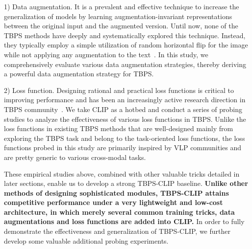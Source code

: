 \documentclass[letterpaper]{article} %
\begin{document}
1) Data augmentation.
It is a prevalent and effective technique to increase the generalization of models by learning augmentation-invariant representations between the original input and the augmented version. 
Until now, none of the TBPS methods have deeply and systematically explored this technique. Instead, they typically employ a simple utilization of random horizontal flip for the image while not applying any augmentation to the text~\cite{wang2020vitaa, chen2022tipcb, ding2021semantically}.
In this study, we comprehensively evaluate various data augmentation strategies, thereby deriving a powerful data augmentation strategy for TBPS.

2) Loss function.
Designing rational and practical loss functions is critical to improving performance and has been an increasingly active research direction in TBPS community~\cite{zhang2018deep, bai2023rasa}.
We take CLIP as a hotbed and conduct a series of probing studies to analyze the effectiveness of various loss functions in TBPS.
Unlike the loss functions in existing TBPS methods that are well-designed mainly from exploring the TBPS task and belong to the task-oriented loss functions, the loss functions probed in this study are primarily inspired by VLP communities and are pretty generic to various cross-modal tasks.

These empirical studies above, combined with other valuable tricks detailed in later sections, enable us to develop a strong TBPS-CLIP baseline.
\textbf{Unlike other methods of designing sophisticated modules, TBPS-CLIP attains competitive performance under a very lightweight and low-cost architecture, in which merely several common training tricks, data augmentations and loss functions are added into CLIP.}
In order to fully demonstrate the effectiveness and generalization of TBPS-CLIP, we further develop some valuable additional probing experiments.
\end{document}
